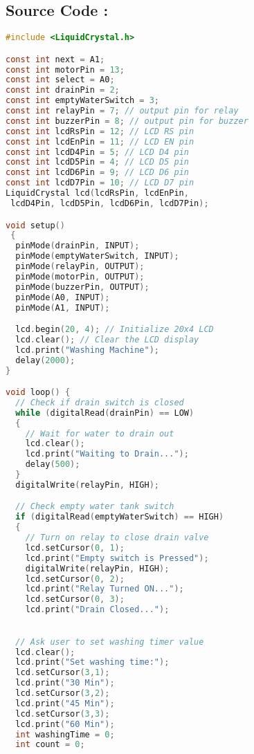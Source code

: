 \documentclass[12pt]{article}
\begin{document}
 \subsection*{\textbf{Source Code :}}
  \begin{lstlisting}[language=C] 
#include <LiquidCrystal.h>

const int next = A1;
const int motorPin = 13;
const int select = A0;
const int drainPin = 2;
const int emptyWaterSwitch = 3;
const int relayPin = 7; // output pin for relay
const int buzzerPin = 8; // output pin for buzzer
const int lcdRsPin = 12; // LCD RS pin
const int lcdEnPin = 11; // LCD EN pin
const int lcdD4Pin = 5; // LCD D4 pin
const int lcdD5Pin = 4; // LCD D5 pin
const int lcdD6Pin = 9; // LCD D6 pin
const int lcdD7Pin = 10; // LCD D7 pin
LiquidCrystal lcd(lcdRsPin, lcdEnPin,
 lcdD4Pin, lcdD5Pin, lcdD6Pin, lcdD7Pin);

void setup()
 {
  pinMode(drainPin, INPUT);
  pinMode(emptyWaterSwitch, INPUT);
  pinMode(relayPin, OUTPUT);
  pinMode(motorPin, OUTPUT);
  pinMode(buzzerPin, OUTPUT);
  pinMode(A0, INPUT);
  pinMode(A1, INPUT);

  lcd.begin(20, 4); // Initialize 20x4 LCD
  lcd.clear(); // Clear the LCD display
  lcd.print("Washing Machine"); 
  delay(2000);
}

void loop() {
  // Check if drain switch is closed
  while (digitalRead(drainPin) == LOW) 
  {
    // Wait for water to drain out
    lcd.clear();
    lcd.print("Waiting to Drain...");
    delay(500);
  }
  digitalWrite(relayPin, HIGH);

  // Check empty water tank switch
  if (digitalRead(emptyWaterSwitch) == HIGH) 
  {
    // Turn on relay to close drain valve
    lcd.setCursor(0, 1);
    lcd.print("Empty switch is Pressed");   
    digitalWrite(relayPin, HIGH);
    lcd.setCursor(0, 2);
    lcd.print("Relay Turned ON...");
    lcd.setCursor(0, 3);
    lcd.print("Drain Closed...");
  

  // Ask user to set washing timer value
  lcd.clear();
  lcd.print("Set washing time:");
  lcd.setCursor(3,1);
  lcd.print("30 Min");
  lcd.setCursor(3,2);
  lcd.print("45 Min");
  lcd.setCursor(3,3);
  lcd.print("60 Min");
  int washingTime = 0;
  int count = 0;


\end{lstlisting}
\end{document}
